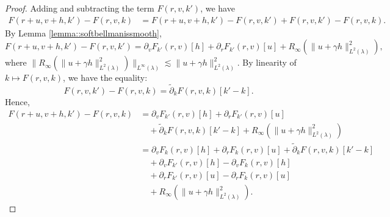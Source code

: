 \documentclass[11pt]{article}
\newcommand{\adk}{\widetilde{\partial}_k}
\theoremstyle{plain}
\begin{document}
\begin{proof}
Adding and subtracting the term $ F(r , v, k') $, we have
\begin{align*}
    F(r + u, v+ h, k') - F(r , v, k) &=  F(r + u, v+ h, k') - F(r , v, k')  +  F(r , v, k')  -  F(r , v, k) .
\end{align*}
By Lemma \ref{lemma::softbellmanissmooth},
\[
F(r + u, v+ h, k') - F(r , v, k')
= \partial_v F_{k'}(r,v)[h] + \partial_r F_{k'}(r,v)[u]
+ R_{\infty}(\|u + \gamma h\|_{L^2(\lambda)}^2),
\]
where $\|R_{\infty}(\|u + \gamma h\|_{L^2(\lambda)}^2)\|_{L^\infty(\lambda)} \lesssim \|u + \gamma h\|_{L^2(\lambda)}^2$. By linearity of $k \mapsto F(r,v, k)$, we have the equality:
\[
F(r , v, k') - F(r , v, k) = \adk F(r,v, k)[k' - k].
\]
Hence,
\begin{align}
    F(r + u, v+ h, k') - F(r , v, k)
    &= \partial_v F_{k'}(r,v)[h] + \partial_r F_{k'}(r,v)[u] \nonumber \\
    &\quad + \adk F(r,v, k)[k' - k]
    + R_{\infty}(\|u + \gamma h\|_{L^2(\lambda)}^2) \nonumber \\
     &= \partial_v F_{k}(r,v)[h] + \partial_r F_{k}(r,v)[u]
     + \adk F(r,v, k)[k' - k]  \nonumber \\
     & \quad + \partial_v F_{k'}(r,v)[h]  - \partial_v F_{k}(r,v)[h] \nonumber \\
     & \quad + \partial_r F_{k'}(r,v)[u] - \partial_r F_{k}(r,v)[u] \nonumber \\
     & \quad + R_{\infty}(\|u + \gamma h\|_{L^2(\lambda)}^2). \label{eqnproof:addsub1}
\end{align}

 




\end{proof}
\end{document}

